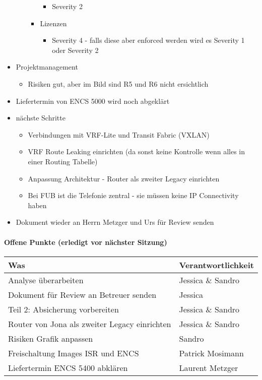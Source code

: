 \begin{itemize}
\begin{itemize}
\begin{itemize}
\begin{itemize}
				\item Severity 2
			\end{itemize}
			\item Lizenzen
			\begin{itemize}
				\item Severity 4 - falls diese aber enforced werden wird es Severity 1 oder Severity 2
			\end{itemize}
		\end{itemize}
	\end{itemize}
	\item Projektmanagement
	\begin{itemize}
		\item Risiken gut, aber im Bild sind R5 und R6 nicht ersichtlich
	\end{itemize}
	\item Liefertermin von ENCS 5000 wird noch abgeklärt
	\item nächste Schritte
	\begin{itemize}
		\item Verbindungen mit VRF-Lite und Transit Fabric (VXLAN)
		\item VRF Route Leaking einrichten (da sonst keine Kontrolle wenn alles in einer Routing Tabelle)
		\item Anpassung Architektur - Router als zweiter Legacy einrichten
		\item Bei FUB ist die Telefonie zentral - sie müssen keine IP Connectivity haben
	\end{itemize}
	\item Dokument wieder an Herrn Metzger und Urs für Review senden
\end{itemize}


\paragraph{Offene Punkte (erledigt vor nächster Sitzung)} \mbox{}
\begin{table}[H]
	\centering
	\begin{tabularx}{\textwidth}{X | p{4.5cm}}
		\rowcolor{gray!50}
		\textbf{Was} & \textbf{Verantwortlichkeit} \\
		\hline	
		Analyse überarbeiten & Jessica \& Sandro  \\
		Dokument für Review an Betreuer senden & Jessica \\
		Teil 2: Absicherung vorbereiten & Jessica \& Sandro \\
		Router von Jona als zweiter Legacy einrichten & Jessica \& Sandro \\
		Risiken Grafik anpassen & Sandro \\
		Freischaltung Images ISR und ENCS & Patrick Mosimann \\
		Liefertermin ENCS 5400 abklären & Laurent Metzger \\
	\end{tabularx}
	\label{tab:my-label}
\end{table}

